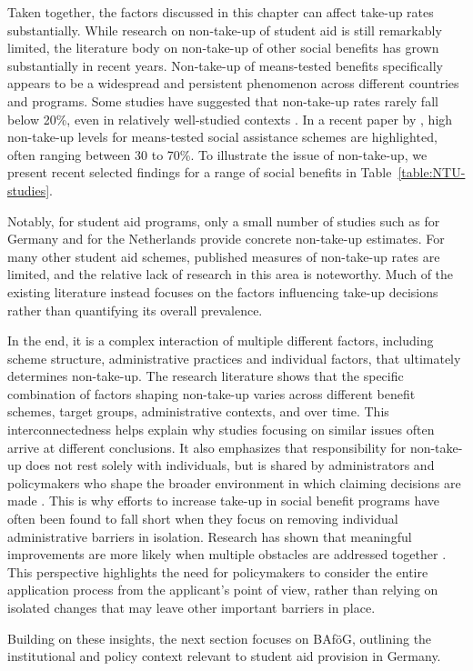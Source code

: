 
Taken together, the factors discussed in this chapter can affect take-up rates substantially. While research on non-take-up of student aid is still remarkably limited, the literature body on non-take-up of other social benefits has grown substantially in recent years. Non-take-up of means-tested benefits specifically appears to be a widespread and persistent phenomenon across different countries and programs. Some studies have suggested that non-take-up rates rarely fall below 20\%, even in relatively well-studied contexts \citep{vanoorschot_failing_2002}. In a recent paper by \cite{goedeme_concept_2020}, high non-take-up levels for means-tested social assistance schemes are highlighted, often ranging between 30 to 70\%. To illustrate the issue of non-take-up, we present recent selected findings for a range of social benefits in Table~\ref{table:NTU-studies}.



Notably, for student aid programs, only a small number of studies such as \cite{herber_non-take-up_2019} for Germany and \cite{konijn_quantifying_2023} for the Netherlands provide concrete non-take-up estimates. For many other student aid schemes, published measures of non-take-up rates are limited, and the relative lack of research in this area is noteworthy. Much of the existing literature instead focuses on the factors influencing take-up decisions rather than quantifying its overall prevalence.

In the end, it is a complex interaction of multiple different factors, including scheme structure, administrative practices and individual factors, that ultimately determines non-take-up. The research literature shows that the specific combination of factors shaping non-take-up varies across different benefit schemes, target groups, administrative contexts, and over time. This interconnectedness helps explain why studies focusing on similar issues often arrive at different conclusions. It also emphasizes that responsibility for non-take-up does not rest solely with individuals, but is shared by administrators and policymakers who shape the broader environment in which claiming decisions are made \citep{vanoorschot_failing_2002}. This is why efforts to increase take-up in social benefit programs have often been found to fall short when they focus on removing individual administrative barriers in isolation. Research has shown that meaningful improvements are more likely when multiple obstacles are addressed together \citep{currie_takeup_2004}. This perspective highlights the need for policymakers to consider the entire application process from the applicant’s point of view, rather than relying on isolated changes that may leave other important barriers in place.

Building on these insights, the next section focuses on BAföG, outlining the institutional and policy context relevant to student aid provision in Germany.